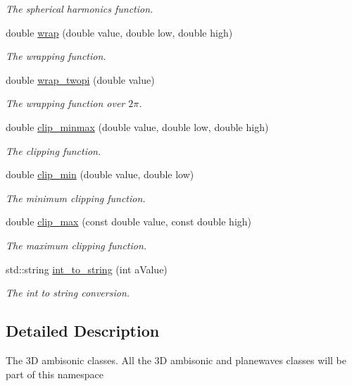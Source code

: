 \begin{DoxyCompactItemize}
\begin{DoxyCompactList}\small\item\em The spherical harmonics function. \end{DoxyCompactList}\item 
double \hyperlink{namespace_hoa3_d_a797e7afd706be7e4c1b5961214991f35}{wrap} (double value, double low, double high)
\begin{DoxyCompactList}\small\item\em The wrapping function. \end{DoxyCompactList}\item 
double \hyperlink{namespace_hoa3_d_a0396e69cca8a7112c6bd1a817fc3ca80}{wrap\-\_\-twopi} (double value)
\begin{DoxyCompactList}\small\item\em The wrapping function over $2\pi$. \end{DoxyCompactList}\item 
double \hyperlink{namespace_hoa3_d_af7d43c71e1aba23d9bff6ffa2db6b95b}{clip\-\_\-minmax} (double value, double low, double high)
\begin{DoxyCompactList}\small\item\em The clipping function. \end{DoxyCompactList}\item 
double \hyperlink{namespace_hoa3_d_a7db8378887542d24d61bed71b482848e}{clip\-\_\-min} (double value, double low)
\begin{DoxyCompactList}\small\item\em The minimum clipping function. \end{DoxyCompactList}\item 
double \hyperlink{namespace_hoa3_d_a6cf3a35e887d29d4b84f0fa38e259317}{clip\-\_\-max} (const double value, const double high)
\begin{DoxyCompactList}\small\item\em The maximum clipping function. \end{DoxyCompactList}\item 
std\-::string \hyperlink{namespace_hoa3_d_ab024831d11dc580dd88a739d93a9cb5c}{int\-\_\-to\-\_\-string} (int a\-Value)
\begin{DoxyCompactList}\small\item\em The int to string conversion. \end{DoxyCompactList}\end{DoxyCompactItemize}


\subsection{Detailed Description}
The 3\-D ambisonic classes. All the 3\-D ambisonic and planewaves classes will be part of this namespace 

